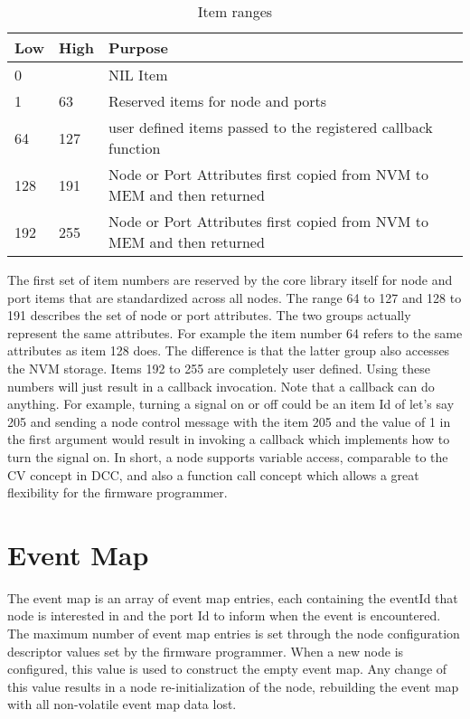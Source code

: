\begin{table}[h!]
    \begin{center}
        \caption{Item ranges}
        \begin{tabular}{|l|l|p{}|}
            \toprule
            \textbf{Low} & \textbf{High} & \textbf{Purpose} \\
            \midrule
            0 & & NIL Item \\
            \midrule
            1 & 63 & Reserved items for node and ports \\
            \midrule
            64 & 127 & user defined items passed to the registered callback function \\
            \midrule
            128 & 191 & Node or Port Attributes first copied from NVM to MEM and then returned \\
            \midrule
            192 & 255 & Node or Port Attributes first copied from NVM to MEM and then returned \\
            \bottomrule
        \end{tabular}
    \end{center}
\end{table}

The first set of item numbers are reserved by the core library itself for node and port items that are standardized across all nodes. The range 64 to 127 and 128 to 191 describes the set of node or port attributes. The two groups actually represent the same attributes. For example the item number 64 refers to the same attributes as item 128 does. The difference is that the latter group also accesses the NVM storage. Items 192 to 255 are completely user defined. Using these numbers will just result in a callback invocation. Note that a callback can do anything. For example, turning a signal on or off could be an item Id of let's say 205 and sending a node control message with the item 205 and the value of 1 in the first argument would result in invoking a callback which implements how to turn the signal on. In short, a node supports variable access, comparable to the CV concept in DCC, and also a function call concept which allows a great flexibility for the firmware programmer.

\section{Event Map}

The event map is an array of event map entries, each containing the eventId that node is interested in and the port Id to inform when the event is encountered. The maximum number of event map entries is set through the node configuration descriptor values set by the firmware programmer. When a new node is configured, this value is used to construct the empty event map. Any change of this value results in a node re-initialization of the node, rebuilding the event map with all non-volatile event map data lost.

